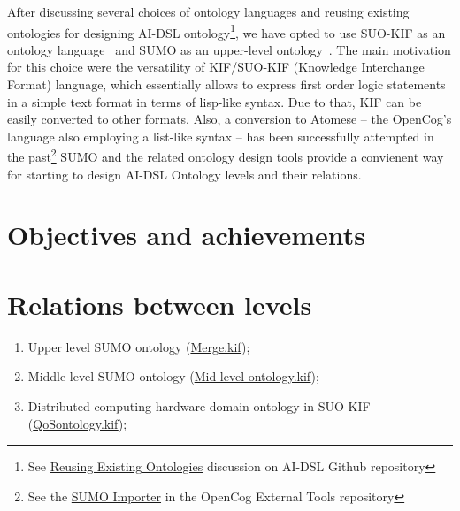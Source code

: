 \documentclass[]{report}
\newcommand{\kabir}[2][]{\todo[color=yellow,author=kabir, #1]{#2}}
\begin{document}
After discussing several choices of ontology languages and reusing existing
ontologies for designing AI-DSL ontology\footnote{See
\href{https://github.com/singnet/ai-dsl/discussions/18}{Reusing Existing
Ontologies} discussion on AI-DSL Github repository\cite{AIDSLRepo}}, we have opted to
use SUO-KIF as an ontology language~\cite{pease_standard_2009} and SUMO as an
upper-level ontology~\cite{NilesPease2001}. The main motivation for this choice
were the versatility of KIF/SUO-KIF (Knowledge Interchange Format) language,
which essentially allows to express first order logic statements in a simple
text format in terms of lisp-like syntax. Due to that, KIF can be easily
converted to other formats\cite{kalibatiene_survey_2011}. Also, a conversion to
Atomese -- the OpenCog's language also employing a list-like syntax -- has been
successfully attempted in the past\footnote{See
the \href{https://github.com/opencog/external-tools/tree/master/SUMO_importer}{SUMO
  Importer} in the OpenCog External Tools
repository\cite{ExternalToolsRepo}} SUMO and the related ontology design tools
\cite{pease_sigma_2001} provide a convienent way for starting to design AI-DSL
Ontology levels and their relations.

\kabir[inline]{Finished here: 2021-05-27T01:37 CET}

\section{Objectives and achievements}

\section{Relations between levels}

\begin{enumerate}
  \item Upper level SUMO ontology
  (\href{https://github.com/ontologyportal/sumo/blob/master/Merge.kif}{Merge.kif});
  \item Middle level SUMO ontology
(\href{https://github.com/ontologyportal/sumo/blob/master/Mid-level-ontology.kif}{Mid-level-ontology.kif});
  \item Distributed computing hardware domain ontology in SUO-KIF
(\href{https://github.com/ontologyportal/sumo/blob/master/QoSontology.kif}{QoSontology.kif});
\end{enumerate}
\end{document}
